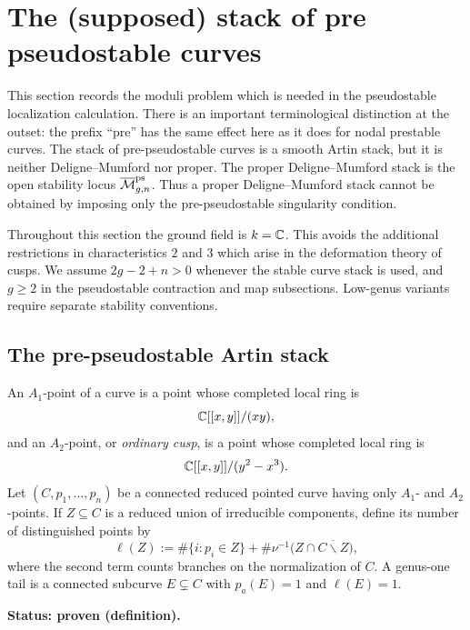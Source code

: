 \documentclass[12pt]{memoir}
\begin{document}
\section{The (supposed) stack of pre pseudostable curves}


\iffalse
\label{sec-pre-ps-curves-and-maps}

This section records the moduli problem which is needed in the
pseudostable localization calculation.  There is an important terminological
distinction at the outset: the prefix ``pre'' has the same effect here as it
does for nodal prestable curves.  The stack of pre-pseudostable curves is a
smooth Artin stack, but it is neither Deligne--Mumford nor proper.  The proper
Deligne--Mumford stack is the open stability locus
\(\overline{\mathcal{M}}^{\operatorname{\mathrm{ps}}}_{g,n}\).  Thus a proper Deligne--Mumford stack cannot be
obtained by imposing only the pre-pseudostable singularity condition.

Throughout this section the ground field is \(k=\mathbb{C}\).  This avoids the
additional restrictions in characteristics \(2\) and \(3\) which arise in the
deformation theory of cusps.  We assume \(2g-2+n>0\) whenever the stable
curve stack is used, and \(g\geq2\) in the pseudostable contraction and map
subsections.  Low-genus variants require separate stability conventions.

\subsection{The pre-pseudostable Artin stack}

\begin{Def}
    An \(A_1\)-point of a curve is a point whose completed local ring is
    \[
        \mathbb{C}[[x,y]]/(xy),
    \]
    and an \(A_2\)-point, or \emph{ordinary cusp}, is a point whose completed
    local ring is
    \[
        \mathbb{C}[[x,y]]/(y^2-x^3).
    \]
    Let \((C,p_1,\ldots,p_n)\) be a connected reduced pointed curve having
    only \(A_1\)- and \(A_2\)-points.  If \(Z\subseteq C\) is a reduced union
    of irreducible components, define its number of distinguished points by
    \[
        \ell(Z):=
        \#\{i:p_i\in Z\}
        +\#\nu^{-1}\bigl(Z\cap\overline{C\smallsetminus Z}\bigr),
    \]
    where the second term counts branches on the normalization of \(C\).
    A genus-one tail is a connected subcurve \(E\subsetneq C\) with
    \(p_a(E)=1\) and \(\ell(E)=1\).

    \noindent\textbf{Status: proven (definition).}
\end{Def}
\end{document}
